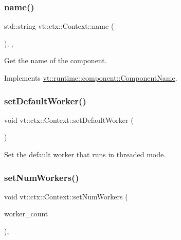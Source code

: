 \subsubsection{\texorpdfstring{name()}{name()}}
{\footnotesize\ttfamily std\+::string vt\+::ctx\+::\+Context\+::name (\begin{DoxyParamCaption}{ }\end{DoxyParamCaption})\hspace{0.3cm}{\ttfamily [inline]}, {\ttfamily [override]}, {\ttfamily [virtual]}}



Get the name of the component. 



Implements \hyperlink{structvt_1_1runtime_1_1component_1_1_component_name_a33c06229bb605a2b2ceff68830d6d773}{vt\+::runtime\+::component\+::\+Component\+Name}.

\mbox{\label{structvt_1_1ctx_1_1_context_ab61a961c47c8fc6393df8c121ade3aa2}} 
\subsubsection{\texorpdfstring{set\+Default\+Worker()}{setDefaultWorker()}}
{\footnotesize\ttfamily void vt\+::ctx\+::\+Context\+::set\+Default\+Worker (\begin{DoxyParamCaption}{ }\end{DoxyParamCaption})\hspace{0.3cm}{\ttfamily [private]}}



Set the default worker that runs in threaded mode. 

\mbox{\label{structvt_1_1ctx_1_1_context_afc4549ac9cdae67301613613b9381d1c}} 
\subsubsection{\texorpdfstring{set\+Num\+Workers()}{setNumWorkers()}}
{\footnotesize\ttfamily void vt\+::ctx\+::\+Context\+::set\+Num\+Workers (\begin{DoxyParamCaption}\item[{\hyperlink{namespacevt_aa93398ea48f2cb6c188512250f7cc248}{Worker\+Count\+Type} const}]{worker\+\_\+count }\end{DoxyParamCaption})\hspace{0.3cm}{\ttfamily [inline]}, {\ttfamily [protected]}}



